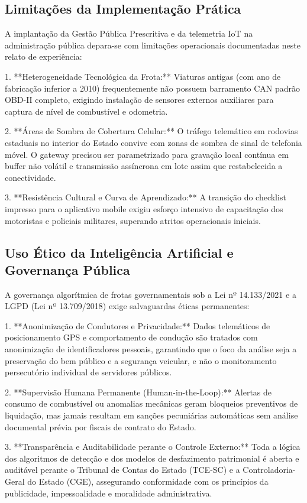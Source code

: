 \documentclass[12pt,a4paper]{article}
\begin{document}
\subsection{Limitações da Implementação Prática}

A implantação da Gestão Pública Prescritiva e da telemetria IoT na administração pública depara-se com limitações operacionais documentadas neste relato de experiência:

1. **Heterogeneidade Tecnológica da Frota:** Viaturas antigas (com ano de fabricação inferior a 2010) frequentemente não possuem barramento CAN padrão OBD-II completo, exigindo instalação de sensores externos auxiliares para captura de nível de combustível e odometria.

2. **Áreas de Sombra de Cobertura Celular:** O tráfego telemático em rodovias estaduais no interior do Estado convive com zonas de sombra de sinal de telefonia móvel. O gateway precisou ser parametrizado para gravação local contínua em buffer não volátil e transmissão assíncrona em lote assim que restabelecida a conectividade.

3. **Resistência Cultural e Curva de Aprendizado:** A transição do checklist impresso para o aplicativo mobile exigiu esforço intensivo de capacitação dos motoristas e policiais militares, superando atritos operacionais iniciais.


\subsection{Uso Ético da Inteligência Artificial e Governança Pública}

A governança algorítmica de frotas governamentais sob a Lei nº 14.133/2021 e a LGPD (Lei nº 13.709/2018) exige salvaguardas éticas permanentes:

1. **Anonimização de Condutores e Privacidade:** Dados telemáticos de posicionamento GPS e comportamento de condução são tratados com anonimização de identificadores pessoais, garantindo que o foco da análise seja a preservação do bem público e a segurança veicular, e não o monitoramento persecutório individual de servidores públicos.

2. **Supervisão Humana Permanente (Human-in-the-Loop):** Alertas de consumo de combustível ou anomalias mecânicas geram bloqueios preventivos de liquidação, mas jamais resultam em sanções pecuniárias automáticas sem análise documental prévia por fiscais de contrato do Estado.

3. **Transparência e Auditabilidade perante o Controle Externo:** Toda a lógica dos algoritmos de detecção e dos modelos de desfazimento patrimonial é aberta e auditável perante o Tribunal de Contas do Estado (TCE-SC) e a Controladoria-Geral do Estado (CGE), assegurando conformidade com os princípios da publicidade, impessoalidade e moralidade administrativa.
\end{document}
